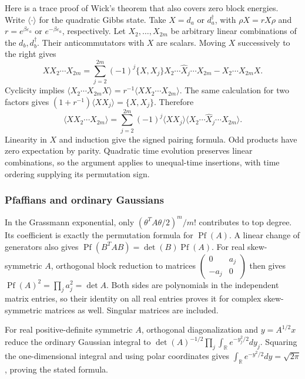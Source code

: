 \documentclass[11pt]{article}
\numberwithin{equation}{section}
\theoremstyle{exposition}
\theoremstyle{result}
\newcommand{\R}{\mathbb R}
\newcommand{\Pf}{\operatorname{Pf}}
\begin{document}
Here is a trace proof of Wick's theorem that also covers zero block energies. Write $\langle\cdot\rangle$ for the quadratic Gibbs state. Take $X=d_a$ or $d_a^\dagger$, with $\rho X=rX\rho$ and $r=e^{\beta\varepsilon_a}$ or $e^{-\beta\varepsilon_a}$, respectively. Let $X_2,\ldots,X_{2m}$ be arbitrary linear combinations of the $d_b,d_b^\dagger$. Their anticommutators with $X$ are scalars. Moving $X$ successively to the right gives
\begin{equation*}
XX_2\cdots X_{2m}
=\sum_{j=2}^{2m}(-1)^j\{X,X_j\}X_2\cdots\widehat X_j\cdots X_{2m}
-X_2\cdots X_{2m}X.
\end{equation*}
Cyclicity implies $\langle X_2\cdots X_{2m}X\rangle=r^{-1}\langle XX_2\cdots X_{2m}\rangle$. The same calculation for two factors gives $(1+r^{-1})\langle XX_j\rangle=\{X,X_j\}$. Therefore
\begin{equation*}
\langle XX_2\cdots X_{2m}\rangle
=\sum_{j=2}^{2m}(-1)^j\langle XX_j\rangle
\langle X_2\cdots\widehat X_j\cdots X_{2m}\rangle.
\end{equation*}
Linearity in $X$ and induction give the signed pairing formula. Odd products have zero expectation by parity. Quadratic time evolution preserves linear combinations, so the argument applies to unequal-time insertions, with time ordering supplying its permutation sign.

\subsubsection{Pfaffians and ordinary Gaussians}
In the Grassmann exponential, only $(\theta^TA\theta/2)^m/m!$ contributes to top degree. Its coefficient is exactly the permutation formula for $\Pf(A)$. A linear change of generators also gives $\Pf(B^TAB)=\det(B)\Pf(A)$. For real skew-symmetric $A$, orthogonal block reduction to matrices $\left(\begin{smallmatrix}0&a_j\\-a_j&0\end{smallmatrix}\right)$ then gives $\Pf(A)^2=\prod_j a_j^2=\det A$. Both sides are polynomials in the independent matrix entries, so their identity on all real entries proves it for complex skew-symmetric matrices as well. Singular matrices are included.

For real positive-definite symmetric $A$, orthogonal diagonalization and $y=A^{1/2}x$ reduce the ordinary Gaussian integral to $\det(A)^{-1/2}\prod_j\int_\R e^{-y_j^2/2}dy_j$. Squaring the one-dimensional integral and using polar coordinates gives $\int_\R e^{-y^2/2}dy=\sqrt{2\pi}$, proving the stated formula.
\end{document}
